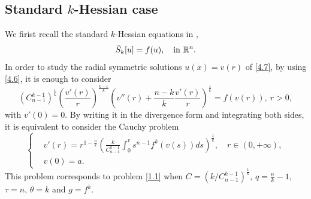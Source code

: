 \documentclass[a4paper,11pt]{amsart}
\theoremstyle{plain}
\theoremstyle{remark}
\numberwithin{equation}{section}
\numberwithin{figure}{section}
\numberwithin{remark}{section}
\begin{document}
\begin{sloppypar}
\subsection{Standard $k$-Hessian case}\label{Section 4.1}
We firist recall the standard $k$-Hessian equations in \cite{JB2010},
	\begin{equation}\label{4.7}
	\tilde S_k [u] = f(u), \quad {\rm in} \ \mathbb{R}^n.
	\end{equation}
In order to study the radial symmetric solutions $u(x)=v(r)$ of \eqref{4.7}, by using \eqref{4.6}, it is enough to consider
	\begin{equation}\label{4.8}
	\left(C_{n-1}^{k-1}\right)^{\frac{1}{k}}\left(\frac{v'(r)}{r}\right)^{\frac{k-1}{k}}\left(v''(r)+\frac{n-k}{k}\frac{v'(r)}{r}\right)^\frac{1}{k} = f(v(r)), \ r>0,
	\end{equation}
with $v'(0)=0$. By writing it in the divergence form and integrating both sides, it is equivalent to consider the Cauchy problem
	\begin{equation}\label{4.9}
	\left\{
	\begin{aligned}
	&v'(r)= r^{1-\frac{n}{k}}  \left(  \frac{k}{C_{n-1}^{k-1}} \int_{0}^{r} s^{n-1} f^{k} (v(s))ds \right )^{\frac{1}{k}}, \quad r\in (0, +\infty), \\
	&v(0)=a.
	\end{aligned}
	\right.
	\end{equation}
	This problem corresponds to problem \eqref{1.1} when $C=\left (k/C_{n-1}^{k-1} \right )^{\frac{1}{k}}$, $q=\frac{n}{k}-1$, $\tau =n$, $\theta =k$ and $g=f^k$.
	

\end{sloppypar}
\end{document}
